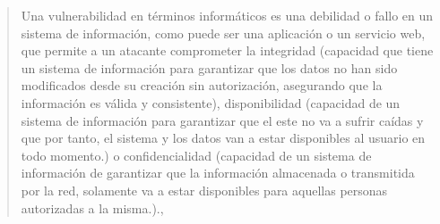 \begin{quote}

\small Una vulnerabilidad en términos informáticos es una debilidad o fallo en un sistema de información, como puede ser una aplicación o un servicio web, que permite a un atacante comprometer la integridad (capacidad que tiene un sistema de información para garantizar que los datos no han sido modificados desde su creación sin autorización, asegurando que la información es válida y consistente), disponibilidad (capacidad de un sistema de información para garantizar que el este no va a sufrir caídas y que por tanto, el sistema y los datos van a  estar disponibles al usuario en todo momento.) o confidencialidad (capacidad de un sistema de información de garantizar que la información almacenada o transmitida por la red, solamente va a estar disponibles para aquellas personas autorizadas a la misma.).\cite{incibe},\cite{infosegur} 

\end{quote}

